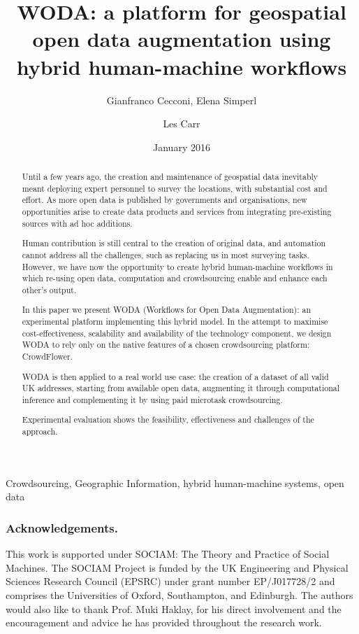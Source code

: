 \documentclass{llncs}
\title{WODA: a platform for geospatial open data augmentation using hybrid human-machine workflows}
\author{Gianfranco Cecconi\inst{1}, Elena Simperl\inst{1} \and Les Carr\inst{1}}
\institute{University of Southampton \email{gc1a13@soton.ac.uk}}
\date{January 2016}
\begin{document}
\maketitle

\begin{abstract}
Until a few years ago, the creation and maintenance of geospatial data inevitably meant deploying expert personnel to survey the locations, with substantial cost and effort. As more open data is published by governments and organisations, new opportunities arise to create data products and services from integrating pre-existing sources with ad hoc additions.

Human contribution is still central to the creation of original data, and automation cannot address all the challenges, such as replacing us in most surveying tasks. However, we have now the opportunity to create hybrid human-machine workflows in which re-using open data, computation and crowdsourcing enable and enhance each other's output. 

In this paper we present WODA (Workflows for Open Data Augmentation): an experimental platform implementing this hybrid model. In the attempt to maximise cost-effectiveness, scalability and availability of the technology component, we design WODA to rely only on the native features of a chosen crowdsourcing platform: CrowdFlower. 

WODA is then applied to a real world use case: the creation of a dataset of all valid UK addresses, starting from available open data, augmenting it through computational inference and complementing it by using paid microtask crowdsourcing. 

Experimental evaluation shows the feasibility, effectiveness and challenges of the approach.
\end{abstract}

\begin{keywords}
Crowdsourcing, Geographic Information, hybrid human-machine systems, open data 
\end{keywords}









\subsubsection{Acknowledgements.} This work is supported under SOCIAM: The Theory and Practice of Social Machines. The SOCIAM Project is funded by the UK Engineering and Physical Sciences Research Council (EPSRC) under grant number EP/J017728/2 and comprises the Universities of Oxford, Southampton, and Edinburgh. The authors would also like to thank Prof. Muki Haklay, for his direct involvement and the encouragement and advice he has provided throughout the research work. 


\end{document}
